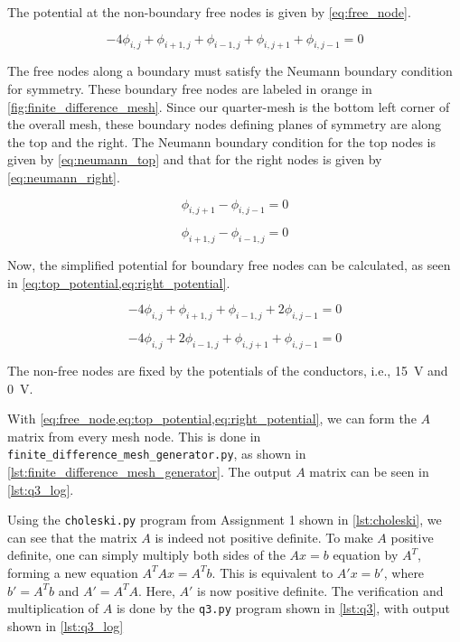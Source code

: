 \documentclass[a4paper,titlepage]{article}
\newcommand{\code}[1]{\texttt{#1}}
\begin{document}
	The potential at the non-boundary free nodes is given by \cref{eq:free_node}.
	
	\begin{equation} \label{eq:free_node}
		-4\phi_{i, j} + \phi_{i + 1, j}  + \phi_{i - 1, j}  + \phi_{i, j + 1}  + \phi_{i, j - 1} = 0
	\end{equation}
	
	The free nodes along a boundary must satisfy the Neumann boundary condition for symmetry. These boundary free nodes are labeled in orange in \cref{fig:finite_difference_mesh}. Since our quarter-mesh is the bottom left corner of the overall mesh, these boundary nodes defining planes of symmetry are along the top and the right. The Neumann boundary condition for the top nodes is given by \cref{eq:neumann_top} and that for the right nodes is given by \cref{eq:neumann_right}.

	\begin{equation} \label{eq:neumann_top}
		\phi_{i, j + 1} - \phi_{i, j - 1} = 0
	\end{equation}
	
	\begin{equation} \label{eq:neumann_right}
		\phi_{i + 1, j} - \phi_{i - 1, j} = 0
	\end{equation}
	
	Now, the simplified potential for boundary free nodes can be calculated, as seen in \cref{eq:top_potential,eq:right_potential}.
	
	\begin{equation} \label{eq:top_potential}
		-4\phi_{i, j} + \phi_{i + 1, j}  + \phi_{i - 1, j}  + 2\phi_{i, j - 1} = 0
	\end{equation}
	
	\begin{equation} \label{eq:right_potential}
		-4\phi_{i, j} + 2\phi_{i - 1, j} + \phi_{i, j + 1}  + \phi_{i, j - 1} = 0
	\end{equation}
	
	The non-free nodes are fixed by the potentials of the conductors, i.e., \SI{15}{\volt} and \SI{0}{\volt}.
	
	With \cref{eq:free_node,eq:top_potential,eq:right_potential}, we can form the $A$ matrix from every mesh node. This is done in \texttt{finite_difference_mesh_generator.py}, as shown in \cref{lst:finite_difference_mesh_generator}. The output $A$ matrix can be seen in \cref{lst:q3_log}.
	
	Using the \code{choleski.py} program from Assignment 1 shown in \cref{lst:choleski}, we can see that the matrix $A$ is indeed not positive definite.	To make $A$ positive definite, one can simply multiply both sides of the $Ax = b$ equation by $A^T$, forming a new equation $A^TAx = A^Tb$. This is equivalent to $A'x = b'$, where $b' = A^Tb$ and $A' = A^TA$. Here, $A'$ is now positive definite. The verification and multiplication of $A$ is done by the \code{q3.py} program shown in \cref{lst:q3}, with output shown in \cref{lst:q3_log}
	
\end{document}
